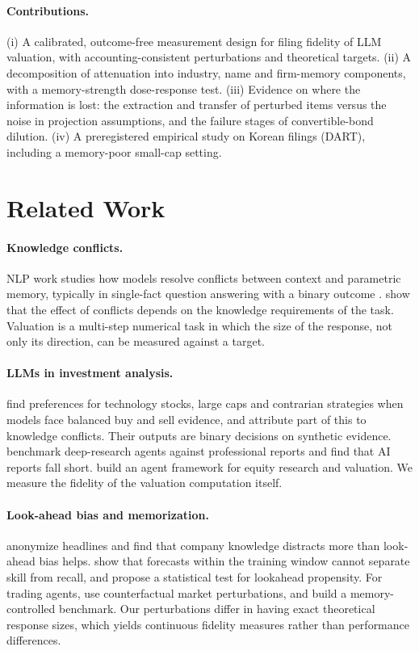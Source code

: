\documentclass[11pt]{article}
\begin{document}
\paragraph{Contributions.} (i) A calibrated, outcome-free measurement design for filing fidelity of LLM valuation, with accounting-consistent perturbations and theoretical targets. (ii) A decomposition of attenuation into industry, name and firm-memory components, with a memory-strength dose-response test. (iii) Evidence on where the information is lost: the extraction and transfer of perturbed items versus the noise in projection assumptions, and the failure stages of convertible-bond dilution. (iv) A preregistered empirical study on Korean filings (DART), including a memory-poor small-cap setting.

\section{Related Work}

\paragraph{Knowledge conflicts.} NLP work studies how models resolve conflicts between context and parametric memory, typically in single-fact question answering with a binary outcome \citep{longpre2021entity,xie2024adaptive,xu2024survey}. \citet{sun2025task} show that the effect of conflicts depends on the knowledge requirements of the task. Valuation is a multi-step numerical task in which the size of the response, not only its direction, can be measured against a target.

\paragraph{LLMs in investment analysis.} \citet{lee2025yourai} find preferences for technology stocks, large caps and contrarian strategies when models face balanced buy and sell evidence, and attribute part of this to knowledge conflicts. Their outputs are binary decisions on synthetic evidence. \citet{haque2026deep} benchmark deep-research agents against professional reports and find that AI reports fall short. \citet{zhou2024finrobot} build an agent framework for equity research and valuation. We measure the fidelity of the valuation computation itself.

\paragraph{Look-ahead bias and memorization.} \citet{glasserman2023assessing} anonymize headlines and find that company knowledge distracts more than look-ahead bias helps. \citet{lopezlira2025memorization} show that forecasts within the training window cannot separate skill from recall, and \citet{gao2025detecting} propose a statistical test for lookahead propensity. For trading agents, \citet{li2025profit} use counterfactual market perturbations, and \citet{zhu2026knowing} build a memory-controlled benchmark. Our perturbations differ in having exact theoretical response sizes, which yields continuous fidelity measures rather than performance differences.
\end{document}
